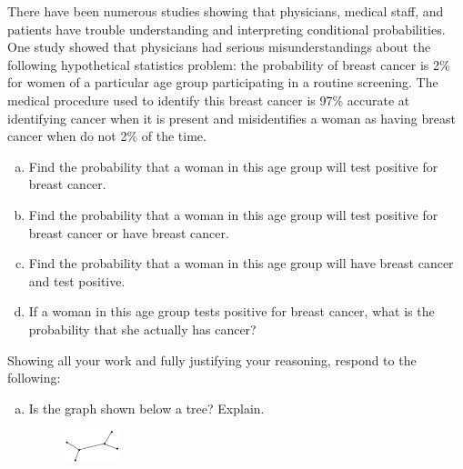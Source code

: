 \documentclass[12pt,letterpaper]{exam}
\begin{document}
\examtitle
{} 
\scores
\bottomline
\newpage

\begin{questions}

\newpage
\question[10] There have been numerous studies showing that physicians, medical staff, and patients have trouble understanding and interpreting conditional probabilities. One study showed that physicians had serious misunderstandings about the following hypothetical statistics problem: the probability of breast cancer is 2\% for women of a particular age group participating in a routine screening. The medical procedure used to identify this breast cancer is 97\% accurate at identifying cancer when it is present and misidentifies a woman as having breast cancer when do not 2\% of the time.
	\begin{enumerate}[(a)]
	\item Find the probability that a woman in this age group will test positive for breast cancer. 
	\item Find the probability that a woman in this age group will test positive for breast cancer or have breast cancer. 
	\item Find the probability that a woman in this age group will have breast cancer and test positive.
	\item If a woman in this age group tests positive for breast cancer, what is the probability that she actually has cancer? 
	\end{enumerate}



\newpage



\newpage
\question[10] Showing all your work and fully justifying your reasoning, respond to the following:
	\begin{enumerate}[(a)]
	\item Is the graph shown below a tree? Explain.
		\begin{figure}[h]
		\centering
		\includegraphics[width=0.15\textwidth]{graph1.jpg}
		\end{figure}
	

\end{enumerate}
\end{questions}
\end{document}
